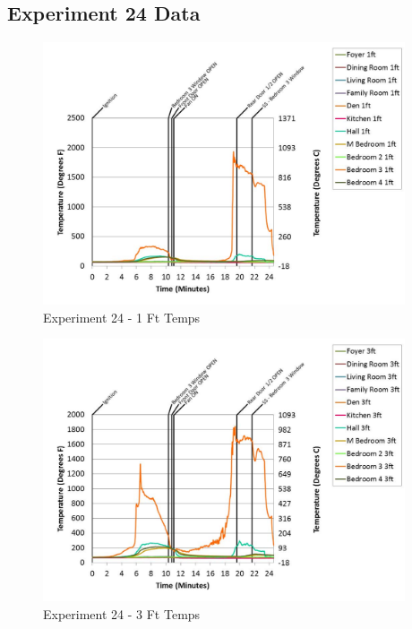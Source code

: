 \documentclass{article}
\begin{document}
\begin{appendices}
	\clearpage

		\clearpage
\clearpage		\large
\subsection{Experiment 24 Data} \label{App:Exp24Results} 

	\begin{figure}[h!]
		\centering
		\includegraphics[height=3.05in]{0_Images/Results_Charts/Exp_24_Charts/1FtTemps.pdf}
		\caption{Experiment 24 - 1 Ft Temps}
	\end{figure}
 

	\begin{figure}[h!]
		\centering
		\includegraphics[height=3.05in]{0_Images/Results_Charts/Exp_24_Charts/3FtTemps.pdf}
		\caption{Experiment 24 - 3 Ft Temps}
	\end{figure}
 
	\clearpage


\end{appendices}
\end{document}
